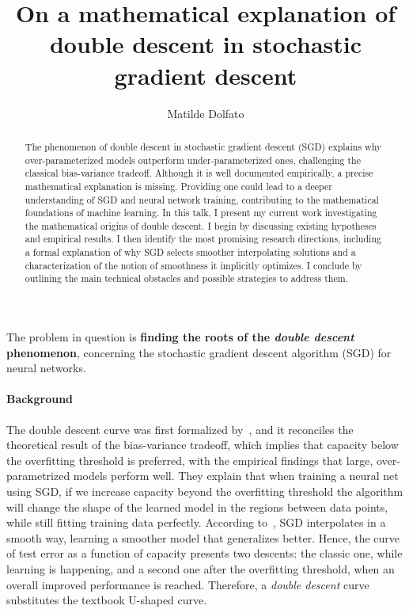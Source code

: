 \documentclass{amsart}
\title{On a mathematical explanation of double descent in stochastic gradient descent}
\author{Matilde Dolfato}
\date{}
\begin{document}
\begin{abstract}
    The phenomenon of double descent in stochastic gradient descent (SGD) explains why over-parameterized models 
    outperform under-parameterized ones, challenging the classical bias-variance tradeoff. Although it is well documented empirically, 
    a precise mathematical explanation is missing. Providing one could lead to a deeper 
    understanding of SGD and neural network training, contributing to the mathematical foundations of 
    machine learning.
    In this talk, I present my current work investigating the mathematical origins of double descent.
    I begin by discussing existing hypotheses and empirical results. I then identify the most promising research directions, including a 
    formal explanation of why SGD selects smoother interpolating solutions 
    and a characterization of the notion of smoothness it implicitly optimizes. I conclude by outlining the main technical 
    obstacles and possible strategies to address them.
\end{abstract}
\maketitle

The problem in question is {\bf finding the roots of the \textit{double descent} phenomenon}, concerning the stochastic gradient descent algorithm (SGD) for neural networks. 
\paragraph{Background} The double descent curve was first formalized by~\cite{belkin}, and it reconciles the theoretical result of the bias-variance tradeoff, which implies that capacity below the overfitting threshold is preferred, with the empirical findings that large, over-parametrized models perform well. 
They explain that when training a neural net using SGD, if we increase capacity beyond the overfitting threshold the algorithm will change the shape of the learned model in the regions between data points, while still fitting training data perfectly. According to~\cite{belkin}, SGD interpolates in a smooth way, learning a smoother model that generalizes better. Hence, the curve of test error as a function of capacity presents two descents: the classic one, while learning is happening, and a second one after the overfitting threshold, when an overall improved performance is reached. Therefore, a \textit{double descent} curve substitutes the textbook U-shaped curve.
\end{document}
